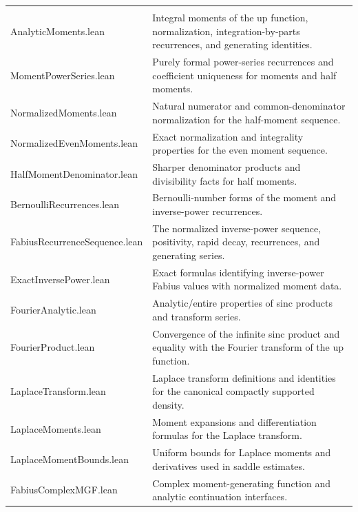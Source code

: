 \documentclass[11pt,a4paper,openany]{book}
\def\module#1{#1.lean}
\newcommand{\module}[1]{\nolinkurl{#1.lean}}
\begin{document}
\begin{longtable}{@{}>{\raggedright\arraybackslash}p{}p{}@{}}
\addlinespace[.28em]
\multicolumn{2}{@{}l}{\sffamily\bfseries\color{OliveDark} Moments, recurrences, generating functions, and transforms} \\
\addlinespace[.45em]
\module{AnalyticMoments} & Integral moments of the up function, normalization, integration-by-parts recurrences, and generating identities. \\
\addlinespace[.28em]
\module{MomentPowerSeries} & Purely formal power-series recurrences and coefficient uniqueness for moments and half moments. \\
\addlinespace[.28em]
\module{NormalizedMoments} & Natural numerator and common-denominator normalization for the half-moment sequence. \\
\addlinespace[.28em]
\module{NormalizedEvenMoments} & Exact normalization and integrality properties for the even moment sequence. \\
\addlinespace[.28em]
\module{HalfMomentDenominator} & Sharper denominator products and divisibility facts for half moments. \\
\addlinespace[.28em]
\module{BernoulliRecurrences} & Bernoulli-number forms of the moment and inverse-power recurrences. \\
\addlinespace[.28em]
\module{FabiusRecurrenceSequence} & The normalized inverse-power sequence, positivity, rapid decay, recurrences, and generating series. \\
\addlinespace[.28em]
\module{ExactInversePower} & Exact formulas identifying inverse-power Fabius values with normalized moment data. \\
\addlinespace[.28em]
\module{FourierAnalytic} & Analytic/entire properties of sinc products and transform series. \\
\addlinespace[.28em]
\module{FourierProduct} & Convergence of the infinite sinc product and equality with the Fourier transform of the up function. \\
\addlinespace[.28em]
\module{LaplaceTransform} & Laplace transform definitions and identities for the canonical compactly supported density. \\
\addlinespace[.28em]
\module{LaplaceMoments} & Moment expansions and differentiation formulas for the Laplace transform. \\
\addlinespace[.28em]
\module{LaplaceMomentBounds} & Uniform bounds for Laplace moments and derivatives used in saddle estimates. \\
\addlinespace[.28em]
\module{FabiusComplexMGF} & Complex moment-generating function and analytic continuation interfaces. \\

\end{longtable}
\end{document}
